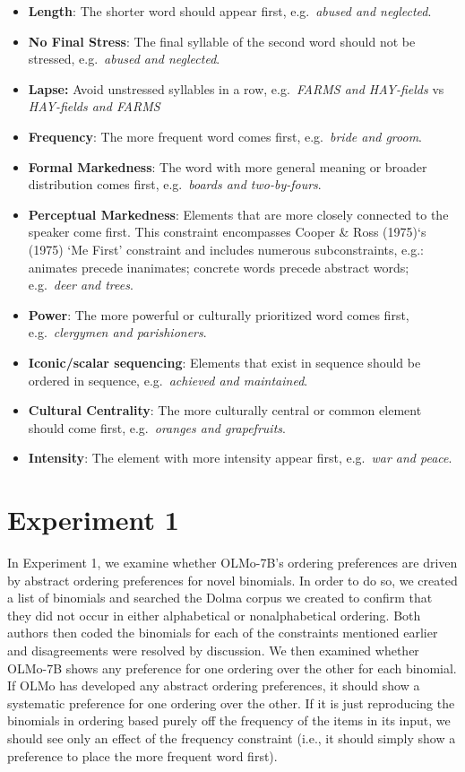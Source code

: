 \documentclass[
  10pt,
  nohyperref]{acl}
\begin{document}
\begin{itemize}
\item
  \textbf{Length}: The shorter word should appear first,
  e.g.~\emph{abused and neglected}.
\item
  \textbf{No Final Stress}: The final syllable of the second word should
  not be stressed, e.g.~\emph{abused and neglected}.
\item
  \textbf{Lapse:} Avoid unstressed syllables in a row, e.g.~\emph{FARMS
  and HAY-fields} vs \emph{HAY-fields and FARMS}
\item
  \textbf{Frequency}: The more frequent word comes first,
  e.g.~\emph{bride and groom}.
\item
  \textbf{Formal Markedness}: The word with more general meaning or
  broader distribution comes first, e.g.~\emph{boards and two-by-fours}.
\item
  \textbf{Perceptual Markedness}: Elements that are more closely
  connected to the speaker come first. This constraint encompasses
  Cooper \& Ross (1975)`s (1975) `Me First' constraint and includes
  numerous subconstraints, e.g.: animates precede inanimates; concrete
  words precede abstract words; e.g.~\emph{deer and trees}.
\item
  \textbf{Power}: The more powerful or culturally prioritized word comes
  first, e.g.~\emph{clergymen and parishioners}.
\item
  \textbf{Iconic/scalar sequencing}: Elements that exist in sequence
  should be ordered in sequence, e.g.~\emph{achieved and maintained}.
\item
  \textbf{Cultural Centrality}: The more culturally central or common
  element should come first, e.g.~\emph{oranges and grapefruits}.
\item
  \textbf{Intensity}: The element with more intensity appear first,
  e.g.~\emph{war and peace}.
\end{itemize}

\section{Experiment 1}\label{experiment-1}

In Experiment 1, we examine whether OLMo-7B's ordering preferences are
driven by abstract ordering preferences for novel binomials. In order to
do so, we created a list of binomials and searched the Dolma corpus we
created to confirm that they did not occur in either alphabetical or
nonalphabetical ordering. Both authors then coded the binomials for each
of the constraints mentioned earlier and disagreements were resolved by
discussion. We then examined whether OLMo-7B shows any preference for
one ordering over the other for each binomial. If OLMo has developed any
abstract ordering preferences, it should show a systematic preference
for one ordering over the other. If it is just reproducing the binomials
in ordering based purely off the frequency of the items in its input, we
should see only an effect of the frequency constraint (i.e., it should
simply show a preference to place the more frequent word first).
\end{document}
